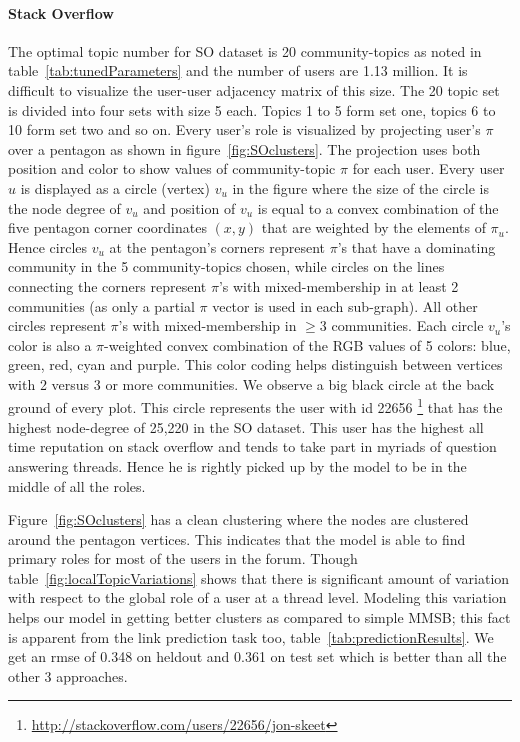 \documentclass{sig-alternate}
\begin{document}
\paragraph{Stack Overflow} 
The optimal topic number for SO dataset is 20 community-topics as noted in
table~\ref{tab:tunedParameters} and the number of users are 1.13 million. It is
difficult to visualize the user-user adjacency matrix of this size. The 20
topic set is divided into four sets with size 5 each. Topics 1 to 5
form set one, topics 6 to 10 form set two and so on. Every user's role is
visualized by projecting user's $\pi$ over a pentagon as shown in
figure~\ref{fig:SOclusters}. The projection uses both position and
color to show values of community-topic $\pi$ for each user.
Every user $u$ is displayed as a circle (vertex) $v_u$ in the figure where the
size of the circle is the node degree of $v_u$ and position of $v_u$ is equal to
a convex combination of the five pentagon corner coordinates $(x, y)$ that are weighted by the
elements of $\pi_u$. Hence circles $v_u$ at the pentagon's corners
represent $\pi$'s that have a dominating community  in the 5
community-topics chosen, while circles on the lines connecting the corners 
represent $\pi$'s with
mixed-membership in at least 2 communities (as only a partial $\pi$ vector is
used in each sub-graph).
All other circles represent $\pi$'s with mixed-membership in $\geq 3$
communities.
Each circle $v_u$'s color is also a $\pi$-weighted convex
combination of the RGB values of 5 colors: blue, green, red, cyan and purple. This
color coding helps distinguish between vertices with 2 versus 3 or more
communities. We observe a big black circle at the back ground of every plot.
This circle represents the user with id 22656
\footnote{\url{http://stackoverflow.com/users/22656/jon-skeet}} that has the highest node-degree of 25,220 in the SO dataset. This user has the highest all time reputation on
stack overflow and tends to take part in myriads of question answering threads.
Hence he is rightly picked up by the model to be in the middle of all the roles. 

Figure~\ref{fig:SOclusters} has a clean clustering where the nodes are clustered
around the pentagon vertices. This indicates that the model is able to find
primary roles for most of the users in the forum.  Though
table~\ref{fig:localTopicVariations} shows that there is significant amount of
variation with respect to the global role of a user at a thread level. 
Modeling this variation helps our model in
getting better clusters as compared to simple MMSB; this fact is apparent from
the link prediction task too, table~\ref{tab:predictionResults}. We get an rmse
of 0.348 on heldout and 0.361 on test set which is better than all the other 3
approaches. 
\end{document}
